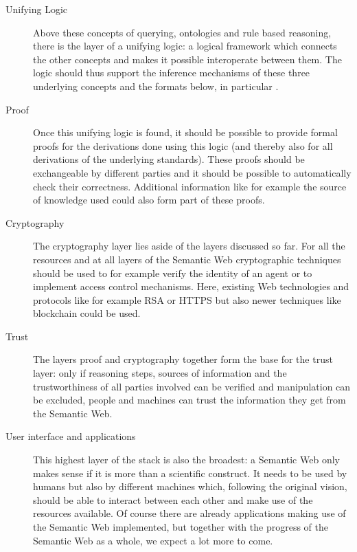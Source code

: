  \begin{description}
 \item[Unifying Logic]
 Above these concepts of querying, ontologies and rule based reasoning, there is the layer of a unifying logic: 
 a logical framework which connects the other concepts and makes it possible interoperate between them. 
The logic should thus support the inference mechanisms of these three underlying concepts and the formats below, in particular \rdf.
 \item[Proof]
 Once this unifying logic is found, it should be possible to provide formal proofs for the derivations done using this logic (and thereby also for all derivations of the underlying standards). 
 These proofs should be exchangeable by different parties and it should be possible to automatically check their correctness. Additional information like for example the source of knowledge 
 used could also form part
 of these proofs.
 \item[Cryptography]
 The cryptography layer lies aside of the layers discussed so far. For all the resources and at all layers of the Semantic Web cryptographic techniques should be used 
 to for example verify the identity of an agent or to implement access control mechanisms. Here, existing Web technologies and protocols like for example RSA or HTTPS but 
 also newer techniques like blockchain could be used.
 \item[Trust]
 The layers proof and cryptography together form the base for the trust layer: only if reasoning steps, sources of information and the trustworthiness of all parties involved
 can be verified and manipulation 
 can be excluded, people and machines can trust the information they get from the Semantic Web.
 \item[User interface and applications]
 This highest layer of the stack is also the broadest: a Semantic Web only makes sense if it is more than a scientific construct. 
 It needs to be used by humans but also by different machines which, following
 the original vision, should be able to interact between each other and make use of the resources available. Of course there are already applications making use of the Semantic Web implemented, but
 together with the progress of the Semantic Web as a whole, we expect a lot more to come.
\end{description}




